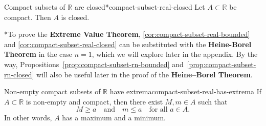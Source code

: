 \documentclass[UTF8,12pt,a4paper]{ctexart}
\numberwithin{equation}{section}
\begin{document}
\begin{cor}{Compact subsets of $\mathbb{R}$ are closed*}{compact-subset-real-closed}
Let $A\subset\mathbb{R}$ be compact. Then $A$ is closed.
\end{cor}

\begin{plainBox}
*To prove the \textbf{Extreme Value Theorem}, \ref{cor:compact-subset-real-bounded} and \ref{cor:compact-subset-real-closed} can be substituted with the \textbf{Heine-Borel Theorem} in the case $n=1$, which we will explore later in the appendix. By the way, Propositions~\ref{prop:compact-subset-rn-bounded} and~\ref{prop:compact-subset-rn-closed} will also be useful later in the proof of the \textbf{Heine--Borel Theorem}.
\end{plainBox}

\begin{prop}{Non-empty compact subsets of $\mathbb{R}$ have extrema}{compact-subset-real-has-extrema}
If $A \subset \mathbb{R}$ is non-empty and compact, then there exist $M, m \in A$ such that 
$$
M \ge a \quad \text{and} \quad m \le a \quad \text{for all } a \in A.
$$
In other words, $A$ has a maximum and a minimum.
\end{prop}
\end{document}
